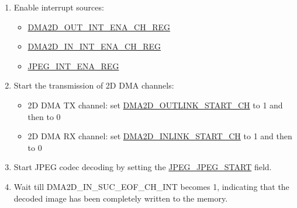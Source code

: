 \documentclass[main\_\_EN.tex]{subfiles}
\begin{document}
\begin{enumerate}
\begin{enumerate}
        Configuration of 5 means reversing the pixel order, for example, reversing the RGB after 2D DMA color space conversion to BGR. Note that, this function is only available for 2D DMA RX channel0, not for any other RX channels.
        \item Configure \hyperref[fielddesc:DMA2DOUTLINKADDRCHN]{DMA2D\_OUTLINK\_ADDR\_CH} as the 2D DMA TX channel linked list address, configure \hyperref[fielddesc:DMA2DINLINKADDRCHN]{DMA2D\_INLINK\_ADDR\_CH} as the 2D DMA RX channel linked list address.
    \end{enumerate}
    \item Enable interrupt sources:
    \begin{itemize}
        \item \hyperref[regdesc:DMA2DOUTINTENACHNREG]{DMA2D\_OUT\_INT\_ENA\_CH\_REG}
        \item \hyperref[regdesc:DMA2DININTENACHNREG]{DMA2D\_IN\_INT\_ENA\_CH\_REG}
        \item \hyperref[regdesc:JPEGINTENAREG]{JPEG\_INT\_ENA\_REG}
    \end{itemize}
    \item Start the transmission of 2D DMA channels:
    \begin{itemize}
        \item 2D DMA TX channel: set \hyperref[fielddesc:DMA2DOUTLINKSTARTCHN]{DMA2D\_OUTLINK\_START\_CH} to 1 and then to 0
        \item 2D DMA RX channel: set \hyperref[fielddesc:DMA2DINLINKSTARTCHN]{DMA2D\_INLINK\_START\_CH} to 1 and then to 0
    \end{itemize}
    \item Start JPEG codec decoding by setting the \hyperref[fielddesc:JPEGJPEGSTART]{JPEG\_JPEG\_START} field.
    \item Wait till DMA2D\_IN\_SUC\_EOF\_CH\_INT becomes 1, indicating that the decoded image has been completely written to the memory.
\end{enumerate}
\end{document}
